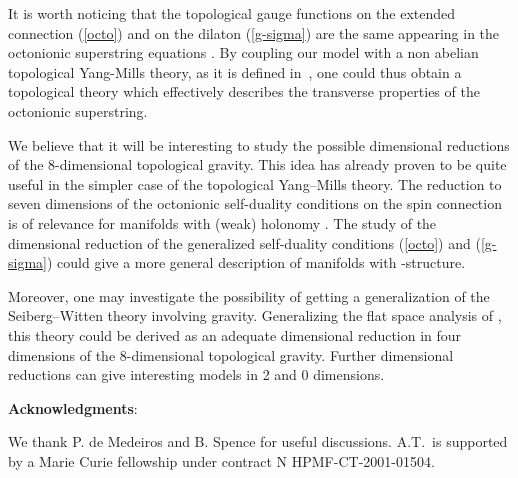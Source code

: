\documentclass[a4paper,12pt]{article}
\begin{document}
It is worth noticing that the topological gauge functions
on the extended connection (\ref{octo}) and 
on the dilaton (\ref{g-sigma}) are the same appearing in the
octonionic superstring equations \cite{stro}.
By coupling our model with a non abelian
topological Yang-Mills theory, as it is defined 
in~\cite{bakasi,Acharya:1997gp},
one could thus obtain a topological theory which effectively
describes the transverse properties of the octonionic
superstring.

We believe that it will be interesting to study the possible 
dimensional reductions of the 8-dimensional topological gravity. 
This idea  has already  proven to be quite useful in the simpler case of 
the topological Yang--Mills theory.
The reduction to seven dimensions of the octonionic
self-duality conditions on the spin connection
is of relevance for
manifolds with (weak) \coordHE{} holonomy     
\cite{Bilal}. The study of the dimensional reduction
of the generalized self-duality conditions (\ref{octo})
and (\ref{g-sigma}) could give a more general description
of manifolds with \coordHE{}-structure.

Moreover, one may investigate the possibility
of getting a generalization of the Seiberg--Witten   
theory involving gravity.  Generalizing the flat space analysis 
of \cite{bakasi}, this theory could be derived as an adequate dimensional
reduction in four dimensions of the 8-dimensional 
topological gravity. Further dimensional reductions can give 
interesting models  in 2 and 0 dimensions.


\vspace{1.cm}

{\bf Acknowledgments}: 

\vspace{.5cm}
\noindent 
We thank P. de Medeiros and B. Spence for useful discussions.
A.T.~is supported by a Marie Curie fellowship under contract
N\coordHE{} HPMF-CT-2001-01504.
\end{document}

